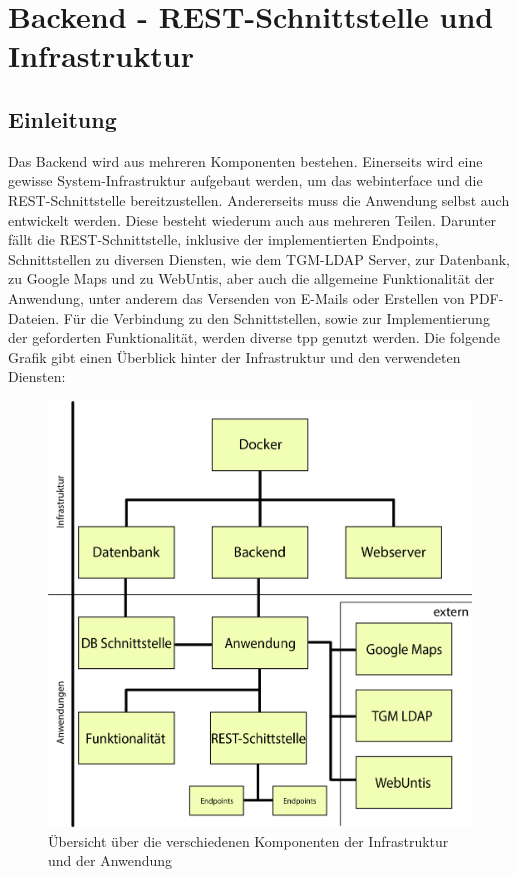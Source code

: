 \section{Backend - REST-Schnittstelle und Infrastruktur}
	\subsection{Einleitung}
	Das Backend wird aus mehreren Komponenten bestehen. Einerseits wird eine gewisse System-Infrastruktur aufgebaut werden, um das \gls{webinterface} und die REST-Schnittstelle bereitzustellen. Andererseits muss die Anwendung selbst auch entwickelt werden. Diese besteht wiederum auch aus mehreren Teilen. Darunter fällt die REST-Schnittstelle, inklusive der implementierten Endpoints, Schnittstellen zu diversen Diensten, wie dem TGM-LDAP Server, zur Datenbank, zu Google Maps und zu WebUntis, aber auch die allgemeine Funktionalität der Anwendung, unter anderem das Versenden von E-Mails oder Erstellen von PDF-Dateien. Für die Verbindung zu den Schnittstellen, sowie zur Implementierung der geforderten Funktionalität, werden diverse  \gls{tpp} genutzt werden. Die folgende Grafik gibt einen Überblick hinter der Infrastruktur und den verwendeten Diensten:
	\begin{figure}[H]
		\centering
		\includegraphics[width=0.8\linewidth]{images/uebersicht}
		\caption[Übersicht über die Komponenten]{Übersicht über die verschiedenen Komponenten der Infrastruktur und der Anwendung}
		\label{fig:uebersicht}
	\end{figure}
	
